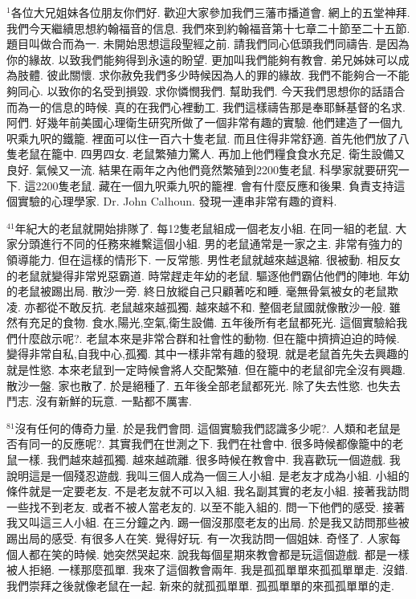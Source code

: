 \documentclass{book}
\begin{document}
$^{1}$各位大兄姐妹各位朋友你們好.
歡迎大家參加我們三藩市播道會.
網上的五堂神拜.
我們今天繼續思想約翰福音的信息.
我們來到約翰福音第十七章二十節至二十五節.
題目叫做合而為一.
未開始思想這段聖經之前.
請我們同心低頭我們同禱告.
是因為你的緣故.
以致我們能夠得到永遠的盼望.
更加叫我們能夠有教會.
弟兄姊妹可以成為肢體.
彼此關懷.
求你赦免我們多少時候因為人的罪的緣故.
我們不能夠合一不能夠同心.
以致你的名受到損毀.
求你憐憫我們.
幫助我們.
今天我們思想你的話語合而為一的信息的時候.
真的在我們心裡動工.
我們這樣禱告那是奉耶穌基督的名求.
阿們.
好幾年前美國心理衛生研究所做了一個非常有趣的實驗.
他們建造了一個九呎乘九呎的鐵籠.
裡面可以住一百六十隻老鼠.
而且住得非常舒適.
首先他們放了八隻老鼠在籠中.
四男四女.
老鼠繁殖力驚人.
再加上他們糧食食水充足.
衛生設備又良好.
氣候又一流.
結果在兩年之內他們竟然繁殖到2200隻老鼠.
科學家就要研究一下.
這2200隻老鼠.
藏在一個九呎乘九呎的籠裡.
會有什麼反應和後果.
負責支持這個實驗的心理學家.
Dr. John Calhoun.
發現一連串非常有趣的資料.

$^{41}$年紀大的老鼠就開始排隊了.
每12隻老鼠組成一個老友小組.
在同一組的老鼠.
大家分頭進行不同的任務來維繫這個小組.
男的老鼠通常是一家之主.
非常有強力的領導能力.
但在這樣的情形下.
一反常態.
男性老鼠就越來越退縮.
很被動.
相反女的老鼠就變得非常兇惡霸道.
時常趕走年幼的老鼠.
驅逐他們霸佔他們的陣地.
年幼的老鼠被踢出局.
散沙一旁.
終日放縱自己只顧著吃和睡.
毫無骨氣被女的老鼠欺凌.
亦都從不敢反抗.
老鼠越來越孤獨.
越來越不和.
整個老鼠國就像散沙一般.
雖然有充足的食物.
食水,陽光,空氣,衛生設備.
五年後所有老鼠都死光.
這個實驗給我們什麼啟示呢?.
老鼠本來是非常合群和社會性的動物.
但在籠中擠擠迫迫的時候.
變得非常自私,自我中心,孤獨.
其中一樣非常有趣的發現.
就是老鼠首先失去興趣的就是性慾.
本來老鼠到一定時候會將人交配繁殖.
但在籠中的老鼠卻完全沒有興趣.
散沙一盤.
家也散了.
於是絕種了.
五年後全部老鼠都死光.
除了失去性慾.
也失去鬥志.
沒有新鮮的玩意.
一點都不厲害.

$^{81}$沒有任何的傳奇力量.
於是我們會問.
這個實驗我們認識多少呢?.
人類和老鼠是否有同一的反應呢?.
其實我們在世測之下.
我們在社會中.
很多時候都像籠中的老鼠一樣.
我們越來越孤獨.
越來越疏離.
很多時候在教會中.
我喜歡玩一個遊戲.
我說明這是一個殘忍遊戲.
我叫三個人成為一個三人小組.
是老友才成為小組.
小組的條件就是一定要老友.
不是老友就不可以入組.
我名副其實的老友小組.
接著我訪問一些找不到老友.
或者不被人當老友的.
以至不能入組的.
問一下他們的感受.
接著我又叫這三人小組.
在三分鐘之內.
踢一個沒那麼老友的出局.
於是我又訪問那些被踢出局的感受.
有很多人在笑.
覺得好玩.
有一次我訪問一個姐妹.
奇怪了.
人家每個人都在笑的時候.
她突然哭起來.
說我每個星期來教會都是玩這個遊戲.
都是一樣被人拒絕.
一樣那麼孤單.
我來了這個教會兩年.
我是孤孤單單來孤孤單單走.
沒錯.
我們崇拜之後就像老鼠在一起.
新來的就孤孤單單.
孤孤單單的來孤孤單單的走.
\end{document}
